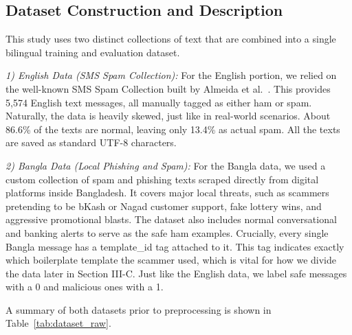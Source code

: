 \documentclass[journal]{IEEEtran}
\begin{document}
\subsection{Dataset Construction and Description}

This study uses two distinct collections of text that are combined into a single bilingual training and evaluation dataset.

\textit{1) English Data (SMS Spam Collection):} For the English portion, we relied on the well-known SMS Spam Collection built by Almeida et al.~\cite{ref1}. This provides 5,574 English text messages, all manually tagged as either ham or spam. Naturally, the data is heavily skewed, just like in real-world scenarios. About 86.6\% of the texts are normal, leaving only 13.4\% as actual spam. All the texts are saved as standard UTF-8 characters.

\textit{2) Bangla Data (Local Phishing and Spam):} For the Bangla data, we used a custom collection of spam and phishing texts scraped directly from digital platforms inside Bangladesh. It covers major local threats, such as scammers pretending to be bKash or Nagad customer support, fake lottery wins, and aggressive promotional blasts. The dataset also includes normal conversational and banking alerts to serve as the safe ham examples. Crucially, every single Bangla message has a template\_id tag attached to it. This tag indicates exactly which boilerplate template the scammer used, which is vital for how we divide the data later in Section III-C. Just like the English data, we label safe messages with a 0 and malicious ones with a 1.

A summary of both datasets prior to preprocessing is shown in Table~\ref{tab:dataset_raw}.

\begin{table}[htbp]
\caption{Dataset Composition Before Preprocessing}
\label{tab:dataset_raw}
\centering
{}
\end{table}
\end{document}
